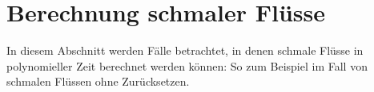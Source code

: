 \chapter{Berechnung schmaler Flüsse}\label{sec-computation-thin-flows}

In diesem Abschnitt werden Fälle betrachtet, in denen schmale Flüsse in polynomieller Zeit berechnet werden können:
So zum Beispiel im Fall von schmalen Flüssen ohne Zurücksetzen.

